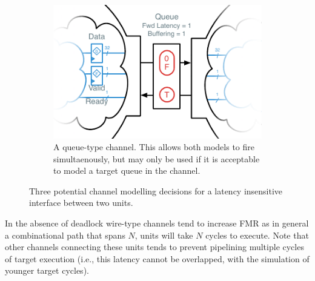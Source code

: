 \begin{figure}
\begin{subfigure}[t]{0.49\textwidth}
    \end{subfigure}
    \begin{subfigure}[t]{0.49\textwidth}
        \captionsetup{margin=0.25cm}
        \includegraphics[width=\columnwidth]{figures/li-queue-channel-manual.pdf}
        \caption{A queue-type channel. This allows both models to
        fire simultaenously, but may only be used if it is acceptable to model
        a target queue in the channel.}
    \end{subfigure}
    \centering
    \caption{Three potential channel modelling decisions for a latency insensitive interface between two units.}
    \label{fig:channel-deadlock}
\end{figure}

In the absence of deadlock wire-type channels tend to increase FMR as in
general a combinational path that spans $N$, units will take $N$ cycles to
execute. Note that other channels connecting these units tends to prevent
pipelining multiple cycles of target execution (i.e., this latency cannot be
overlapped, with the simulation of younger target cycles).

